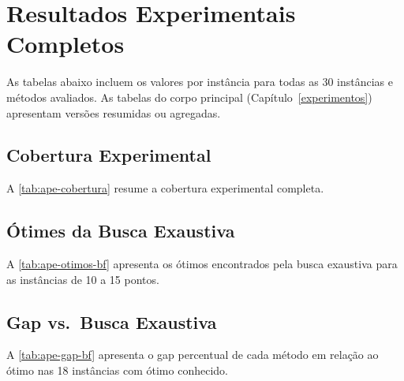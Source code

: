 \chapter[Resultados Experimentais Completos]{Resultados Experimentais Completos}
\label{ape:resultados}

As tabelas abaixo incluem os valores por instância para todas as 30 instâncias e métodos avaliados. As tabelas do corpo principal (Capítulo~\ref{experimentos}) apresentam versões resumidas ou agregadas.

\section{Cobertura Experimental}

A \autoref{tab:ape-cobertura} resume a cobertura experimental completa.

\begin{table}[htbp]
\centering
\caption{Cobertura experimental completa.}
\label{tab:ape-cobertura}

\end{table}

\section{\'Otimes da Busca Exaustiva}

A \autoref{tab:ape-otimos-bf} apresenta os \'otimos encontrados pela busca exaustiva para as instâncias de 10 a 15 pontos.

\begin{table}[htbp]
\centering
\caption{\'Otimes da busca exaustiva.}
\label{tab:ape-otimos-bf}

\end{table}

\section{Gap vs.\ Busca Exaustiva}

A \autoref{tab:ape-gap-bf} apresenta o gap percentual de cada m\'etodo em rela\c{c}\~ao ao \'otimo nas 18 instâncias com \'otimo conhecido.

\begin{table}[htbp]
\centering
\caption{Gap percentual em rela\c{c}\~ao ao \'otimo.}
\label{tab:ape-gap-bf}

\end{table}

